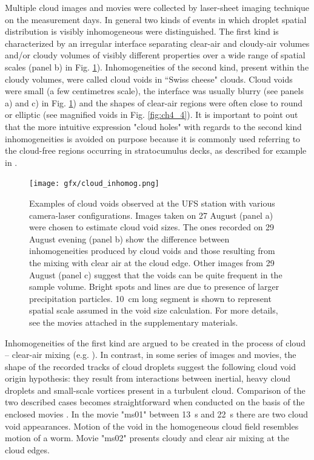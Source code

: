 \documentclass[../main.tex]{subfiles}
\begin{document}
Multiple cloud images and movies were collected by laser-sheet imaging technique on the measurement days. In general two kinds of events in which droplet spatial distribution is visibly inhomogeneous were distinguished. The first kind is characterized by an irregular interface separating clear-air and cloudy-air volumes and/or cloudy volumes of visibly different properties over a wide range of spatial scales (panel b) in Fig. \ref{fig:ch4_3}). Inhomogeneities of the second kind, present within the cloudy volumes, were called cloud voids in ``Swiss cheese" clouds. Cloud voids were small (a few centimetres scale), the interface was usually blurry (see panels a) and c) in Fig. \ref{fig:ch4_3}) and the shapes of clear-air regions were often close to round or elliptic (see magnified voids in Fig. \ref{fig:ch4_4}). It is important to point out that the more intuitive expression "cloud holes" with regards to the second kind inhomogeneities is avoided on purpose because it is commonly used referring to the cloud-free regions occurring in stratocumulus decks, as described for example in \citet{Gerber_2005}.

\begin{figure}[h]
\centering
\noindent\texttt{[image: gfx/cloud\_inhomog.png]}
\caption{Examples of cloud voids observed at the UFS station with various camera-laser configurations. Images taken on 27 August (panel a) were chosen to estimate cloud void sizes. The ones recorded on 29 August evening (panel b) show the difference between inhomogeneities produced by cloud voids and those resulting from the mixing with clear air at the cloud edge. Other images from 29 August (panel c) suggest that the voids can be quite frequent in the sample volume. Bright spots and lines are due to presence of larger precipitation particles. 10~cm long segment is shown to represent spatial scale assumed in the void size calculation. For more details, see the movies attached in the supplementary materials.}
\label{fig:ch4_3}
\end{figure}

Inhomogeneities of the first kind are argued to be created in the process of cloud -- clear-air mixing (e.g. \cite{Warhaft_2000}). In contrast, in some series of images and movies, the shape of the recorded tracks of cloud droplets suggest the following cloud void origin hypothesis: they result from interactions between inertial, heavy cloud droplets and small-scale vortices present in a turbulent cloud. Comparison of the two described cases becomes straightforward when conducted on the basis of the enclosed movies \citep{database}. In the movie "ms01" between 13~s and 22~s there are two cloud void appearances. Motion of the void in the homogeneous cloud field resembles motion of a worm. Movie "ms02" presents cloudy and clear air mixing at the cloud edges. \\
\end{document}
